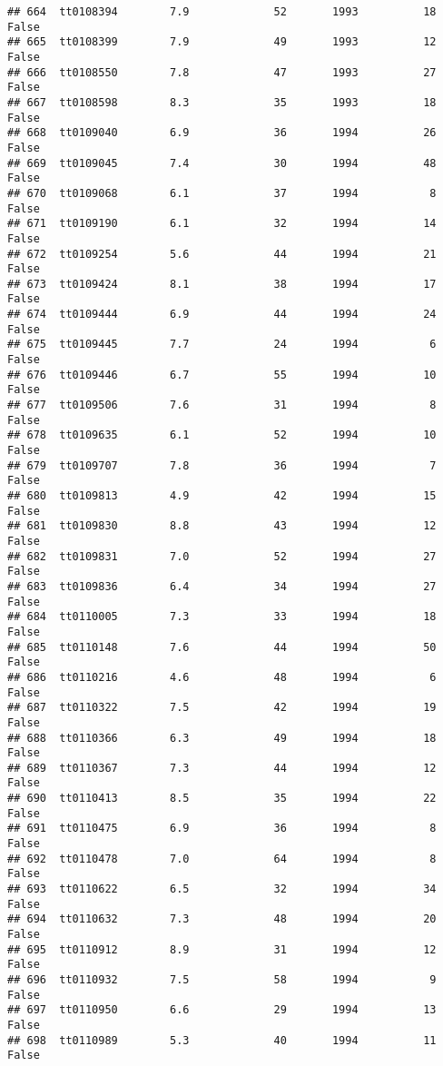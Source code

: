 \documentclass[
]{article}
\begin{document}
\begin{verbatim}
## 664  tt0108394        7.9             52       1993          18   False
## 665  tt0108399        7.9             49       1993          12   False
## 666  tt0108550        7.8             47       1993          27   False
## 667  tt0108598        8.3             35       1993          18   False
## 668  tt0109040        6.9             36       1994          26   False
## 669  tt0109045        7.4             30       1994          48   False
## 670  tt0109068        6.1             37       1994           8   False
## 671  tt0109190        6.1             32       1994          14   False
## 672  tt0109254        5.6             44       1994          21   False
## 673  tt0109424        8.1             38       1994          17   False
## 674  tt0109444        6.9             44       1994          24   False
## 675  tt0109445        7.7             24       1994           6   False
## 676  tt0109446        6.7             55       1994          10   False
## 677  tt0109506        7.6             31       1994           8   False
## 678  tt0109635        6.1             52       1994          10   False
## 679  tt0109707        7.8             36       1994           7   False
## 680  tt0109813        4.9             42       1994          15   False
## 681  tt0109830        8.8             43       1994          12   False
## 682  tt0109831        7.0             52       1994          27   False
## 683  tt0109836        6.4             34       1994          27   False
## 684  tt0110005        7.3             33       1994          18   False
## 685  tt0110148        7.6             44       1994          50   False
## 686  tt0110216        4.6             48       1994           6   False
## 687  tt0110322        7.5             42       1994          19   False
## 688  tt0110366        6.3             49       1994          18   False
## 689  tt0110367        7.3             44       1994          12   False
## 690  tt0110413        8.5             35       1994          22   False
## 691  tt0110475        6.9             36       1994           8   False
## 692  tt0110478        7.0             64       1994           8   False
## 693  tt0110622        6.5             32       1994          34   False
## 694  tt0110632        7.3             48       1994          20   False
## 695  tt0110912        8.9             31       1994          12   False
## 696  tt0110932        7.5             58       1994           9   False
## 697  tt0110950        6.6             29       1994          13   False
## 698  tt0110989        5.3             40       1994          11   False

\end{verbatim}
\end{document}
